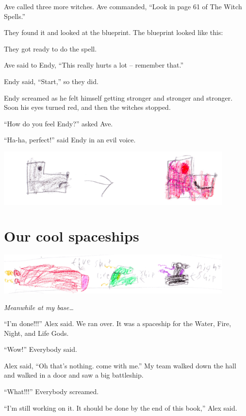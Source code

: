 \documentclass[letterpaper, oneside, 12pt]{krantz}
\begin{document}
Ave called three more witches. Ave commanded, ``Look in page 61 of The
Witch Spells.''

They found it and looked at the blueprint. The blueprint looked like
this:

They got ready to do the spell.

Ave said to Endy, ``This really hurts a lot -- remember that.''

Endy said, ``Start,'' so they did.

Endy screamed as he felt himself getting stronger and stronger and
stronger. Soon his eyes turned red, and then the witches stopped.

``How do you feel Endy?'' asked Ave.

``Ha-ha, perfect!'' said Endy in an evil voice.

\includegraphics[width=4.6875in,height=\textheight]{img/four-bad-guys/endy.jpg}

\hypertarget{our-cool-spaceships}{%
\section{Our cool spaceships}\label{our-cool-spaceships}}

\includegraphics[width=4.6875in,height=\textheight]{img/four-bad-guys/threeships.jpg}

\emph{Meanwhile at my base\ldots{}}

``I'm done!!!'' Alex said. We ran over. It was a spaceship for the
Water, Fire, Night, and Life Gods.

``Wow!'' Everybody said.

Alex said, ``Oh that's nothing. come with me.'' My team walked down the
hall and walked in a door and saw a big battleship.

``What!!!'' Everybody screamed.

``I'm still working on it. It should be done by the end of this book,''
Alex said.
\end{document}
